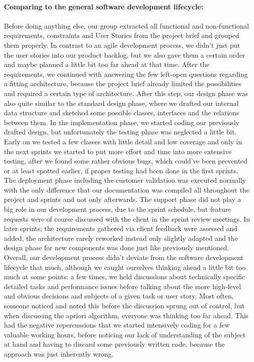 \ \\
{\large\textbf{Comparing to the general software development lifecycle:}}\\ 
\ \\
Before doing anything else, our group extracted all functional and non-functional requirements, constraints and User Stories from the project brief and grouped them properly. In contrast to an agile development process, we didn’t just put the user stories into our product backlog, but we also gave them a certain order and maybe planned a little bit too far ahead at that time. After the requirements, we continued with answering the few left-open questions regarding a fitting architecture, because the project brief already limited the possibilities and required a certain type of architecture. After this step, our design phase was also quite similar to the standard design phase, where we drafted our internal data structure and sketched some possible classes, interfaces and the relations between them. In the implementation phase, we started coding our previously drafted design, but unfortunately the testing phase was neglected a little bit. Early on we tested a few classes with little detail and low coverage and only in the next sprints we started to put more effort and time into more extensive testing, after we found some rather obvious bugs, which could’ve been prevented or at least spotted earlier, if proper testing had been done in the first sprints. The deployment phase including the customer validation was executed normally with the only difference that our documentation was compiled all throughout the project and sprints and not only afterwards. The support phase did not play a big role in our development process, due to the sprint schedule, but feature requests were of course discussed with the client in the sprint review meetings. In later sprints, the requirements gathered via client feedback were assessed and added, the architecture rarely reworked instead only slightly adapted and the design phase for new components was done just like previously mentioned. Overall, our development process didn’t deviate from the software development lifecycle that much, although we caught ourselves thinking ahead a little bit too much at some points: a few times, we held discussions about technically specific detailed tasks and performance issues before talking about the more high-level and obvious decisions and subjects of a given task or user story. Most often, someone noticed and noted this before the discussion sprung out of control, but when discussing the apriori algorithm, everyone was thinking too far ahead. This had the negative repercussions that we started intensively coding for a few valuable working hours, before noticing our lack of understanding of the subject at hand and having to discard some previously written code, because the approach was just inherently wrong. \\
